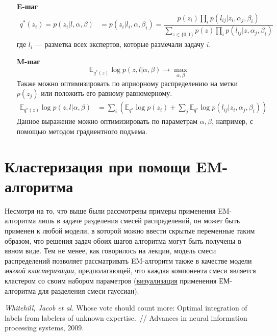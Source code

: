 \documentclass[12pt,a4paper]{article}
\begin{document}
\begin{itemize}
    \item[\textbf{E-шаг}] 
    \begin{align*}
        q^*(z_i) = p(z_i \vert l, \alpha, \beta) &= p(z_i \vert l_i, \alpha, \beta_i)
        = \dfrac{p(z_i) \prod_i p(l_{ij} \vert z_i, \alpha_j, \beta_i)}{\sum_{z \in \{0, 1\}} p(z) \prod_i p(l_{ij} \vert z, \alpha_j, \beta_i)}
    \end{align*}
    где $l_i$ --- разметка всех экспертов, которые размечали задачу $i$. 
    
    \item[\textbf{M-шаг}]
    \begin{equation*}
        \mathbb{E}_{q^*(z)} \log p(z, l \vert \alpha, \beta) \to \max_{\alpha, \beta}
    \end{equation*}
    Также можно оптимизировать по априорному распределению на метки $p(z_j)$ или положить его равному равномерному.
    \begin{align*}
        \mathbb{E}_{q^*(z)} \log p(z, l \vert \alpha, \beta) &= \sum_i \left( \mathbb{E}_{q^*} \log p(z_i) + \sum_j \mathbb{E}_{q^*} \log p(l_{ij} \vert z_{i}, \alpha_j, \beta_i)\right)
    \end{align*}
    Данное выражение можно оптимизировать по параметрам $\alpha, \beta$, например, с помощью методом градиентного подъема.
\end{itemize}


\section{Кластеризация при помощи EM-алгоритма}
\par Несмотря на то, что выше были рассмотрены примеры применения EM-алгоритма лишь в задаче разделения смесей распределений, он может быть применен к любой модели, в которой можно ввести скрытые переменные таким образом, что решения задач обоих шагов алгоритма могут быть получены в явном виде. Тем не менее, как говорилось на лекции, модель смеси распределений позволяет рассматривать EM-алгоритм также в качестве модели \textit{мягкой кластеризации}, предполагающей, что каждая компонента смеси является кластером со своим набором параметров (\href{https://github.com/RobRomijnders/EM}{визуализация} применения ЕМ-алгоритма для разделения смеси гауссиан).


\begin{thebibliography}{1}
    \emph{Whitehill, Jacob et al.}
    Whose vote should count more: Optimal integration of labels from labelers of unknown expertise.~// Advances in neural information processing systems, 2009.
\end{thebibliography}
\end{document}
